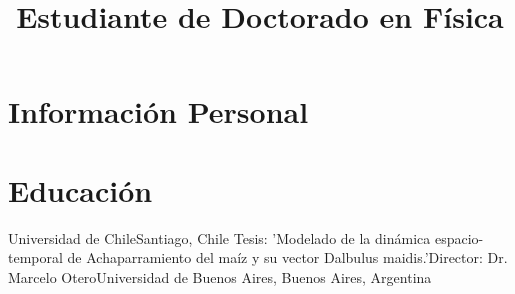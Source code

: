 \documentclass[10pt,a4paper]{moderncv}
\title{Estudiante de Doctorado en F\'isica}               %
\begin{document}
\maketitle

\section{Informaci\'on Personal}




\section{Educaci\'on}
{\newline Universidad de Chile}{Santiago, Chile}{}{}
{\newline Tesis: 'Modelado de la din\'amica espacio-temporal de Achaparramiento del ma\'iz y su vector Dalbulus maidis.'}{Director: Dr. Marcelo Otero}{Universidad de Buenos Aires, Buenos Aires, Argentina}{}



\end{document}
